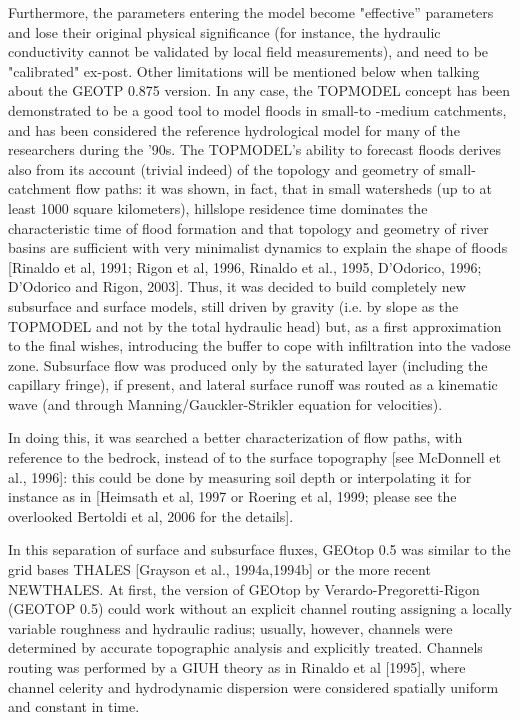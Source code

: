 Furthermore, the parameters entering the model become "effective'' parameters and lose their original physical significance (for instance, the hydraulic conductivity cannot be validated by local field measurements), and need to be "calibrated" ex-post. Other limitations will be mentioned below when talking about the GEOTP 0.875 version. In any case, the TOPMODEL concept has been demonstrated to be a good tool to model floods in small-to -medium catchments, and has been considered the reference hydrological model for many of the researchers during the '90s. The TOPMODEL's ability to forecast floods derives also from its account (trivial indeed) of the topology and geometry of small- catchment flow paths: it was shown, in fact, that in small watersheds (up to at least 1000 square kilometers), hillslope residence time dominates the characteristic time of flood formation and that topology and geometry of river basins are sufficient with very minimalist dynamics to explain the shape of floods [Rinaldo et al, 1991; Rigon et al, 1996, Rinaldo et al., 1995, D'Odorico, 1996; D'Odorico and Rigon, 2003]. 
Thus, it was decided  to build completely new subsurface and surface models, still driven by gravity (i.e. by slope as the TOPMODEL and not by the total hydraulic head) but, as a first approximation to the final wishes, introducing the buffer to cope with infiltration into the vadose zone.  Subsurface flow was produced only by the saturated layer (including the capillary fringe), if present, and lateral surface runoff was routed as a kinematic wave (and through Manning/Gauckler-Strikler equation for velocities). 

In doing this, it was searched  a better characterization of flow paths, with reference to the bedrock, instead of to the surface topography [see McDonnell et al., 1996]: this could be done by measuring soil depth or interpolating it for instance as in [Heimsath et al, 1997 or Roering et al, 1999; please see the overlooked  Bertoldi et al, 2006 for the details]. 

In this separation of surface and subsurface fluxes, GEOtop 0.5 was similar to the grid bases THALES [Grayson et al., 1994a,1994b] or the more recent NEWTHALES. At first, the version of GEOtop by Verardo-Pregoretti-Rigon (GEOTOP 0.5) could work without an explicit channel routing assigning a locally variable roughness and hydraulic radius; usually, however, channels were determined by accurate topographic analysis and explicitly treated. Channels routing was performed by a GIUH theory as in Rinaldo et al [1995], where channel celerity and hydrodynamic dispersion were  considered spatially uniform and constant in time. 

